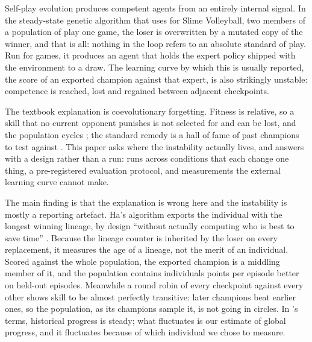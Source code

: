 \documentclass[11pt]{article}
\begin{document}
Self-play evolution produces competent agents from an entirely internal signal.
In the steady-state genetic algorithm that \citet{ha2020slimevolleygym} uses
for Slime Volleyball, two members of a population of \nPop{} play one game, the
loser is overwritten by a mutated copy of the winner, and that is all: nothing
in the loop refers to an absolute standard of play. Run for \nBudget{} games, it
produces an agent that holds the expert policy shipped with the environment to
a draw. The learning curve by which this is usually reported, the score of an
exported champion against that expert, is also strikingly unstable: competence
is reached, lost and regained between adjacent checkpoints.

The textbook explanation is coevolutionary forgetting. Fitness is relative, so
a skill that no current opponent punishes is not selected for and can be lost,
and the population cycles \citep{cliff1995tracking,popovici2012coevolutionary};
the standard remedy is a hall of fame of past champions to test against
\citep{rosin1997new}. This paper asks where the instability actually lives, and
answers with a design rather than a run: \nNRunsTotal{} runs across conditions
that each change one thing, a pre-registered evaluation protocol, and
measurements the external learning curve cannot make.

The main finding is that the explanation is wrong here and the instability is
mostly a reporting artefact. Ha's algorithm exports the individual with the
longest winning lineage, by design ``without actually computing who is best to
save time'' \citep{ha2020slimevolleygym}. Because the lineage counter is
inherited by the loser on every replacement, it measures the age of a lineage,
not the merit of an individual. Scored against the whole population, the
exported champion is a middling member of it, and the population contains
individuals \nPhGap{} points per episode better on held-out episodes. Meanwhile a round robin of every
checkpoint against every other shows skill to be almost perfectly transitive:
later champions beat earlier ones, so the population, as its champions sample it,
is not going in circles.
In \citeauthor{miconi2009why}'s \citeyearpar{miconi2009why} terms, historical
progress is steady; what fluctuates is our estimate of global progress, and
it fluctuates because of which individual we chose to measure.
\end{document}
